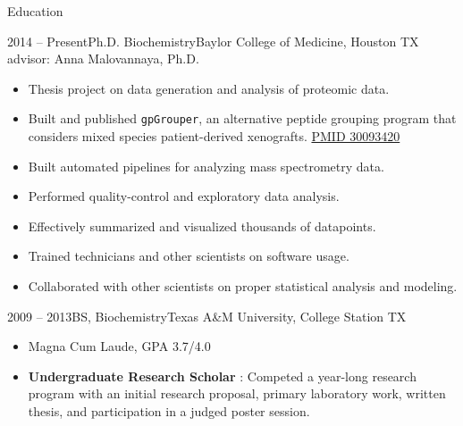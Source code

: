 \documentclass[]{mcdowellcv}
\begin{document}
	\makeheader



	\begin{cvsection}{Education}
		\begin{cvsubsection}{2014 -- Present}{Ph.D. Biochemistry}{Baylor College of Medicine, Houston TX}
      advisor: Anna Malovannaya, Ph.D.
			\begin{itemize}
        \item Thesis project on data generation and analysis of proteomic data.
        \item Built and published \texttt{gpGrouper}, an alternative peptide
          grouping program that considers mixed species patient-derived
          xenografts. \href{https://www.ncbi.nlm.nih.gov/pubmed/30093420}{PMID 30093420}
        \item Built automated pipelines for analyzing mass spectrometry data.
        \item Performed quality-control and exploratory data analysis.
        \item Effectively summarized and visualized thousands of datapoints.
        \item Trained technicians and other scientists on software usage.
        \item Collaborated with other scientists on proper statistical analysis
          and modeling.
			\end{itemize}
		\end{cvsubsection}

    \begin{cvsubsection}{2009 -- 2013}{BS, Biochemistry}{Texas A\&M University, College Station TX}
			\begin{itemize}
        \item Magna Cum Laude, GPA 3.7/4.0
        \item \textbf{Undergraduate Research Scholar} : Competed a year-long
          research program with an initial research proposal, primary laboratory
          work, written thesis, and participation in a judged poster session.
      \end{itemize}
		\end{cvsubsection}
	\end{cvsection}

\end{document}
